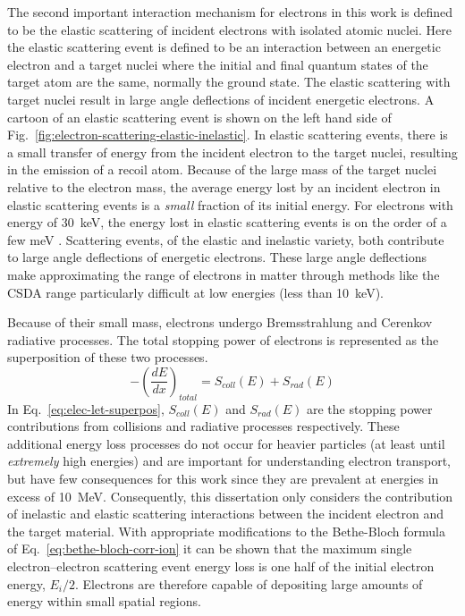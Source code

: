The second important interaction mechanism for electrons in this work is defined to be the elastic scattering of incident electrons with isolated atomic nuclei.
Here the elastic scattering event is defined to be an interaction between an energetic electron and a target nuclei where the initial and final quantum states of the target atom are the same, normally the ground state.
The elastic scattering with target nuclei result in large angle deflections of incident energetic electrons.
A cartoon of an elastic scattering event is shown on the left hand side of Fig.~\ref{fig:electron-scattering-elastic-inelastic}.
In elastic scattering events, there is a small transfer of energy from the incident electron to the target nuclei, resulting in the emission of a recoil atom.
Because of the large mass of the target nuclei relative to the electron mass, the average energy lost by an incident electron in elastic scattering events is a \emph{small} fraction of its initial energy.
For electrons with energy of 30~keV, the energy lost in elastic scattering events is on the order of a few meV \cite{Salvat:ue}.
Scattering events, of the elastic and inelastic variety, both contribute to large angle deflections of energetic electrons.
These large angle deflections make approximating the range of electrons in matter through methods like the CSDA range particularly difficult at low energies (less than 10~keV).

Because of their small mass, electrons undergo Bremsstrahlung and Cerenkov radiative processes.
The total stopping power of electrons is represented as the superposition of these two processes.
\begin{equation}
    \label{eq:elec-let-superpos}
    -\left(\frac{dE}{dx}\right)_{total} = S_{coll}(E) + S_{rad}(E)
\end{equation}
In Eq.~\ref{eq:elec-let-superpos}, $S_{coll}(E)$ and $S_{rad}(E)$ are the stopping power contributions from collisions and radiative processes respectively.
These additional energy loss processes do not occur for heavier particles (at least until \emph{extremely} high energies) and are important for understanding electron transport, but have few consequences for this work since they are prevalent at energies in excess of 10~MeV.
Consequently, this dissertation only considers the contribution of inelastic and elastic scattering interactions between the incident electron and the target material.
With appropriate modifications to the Bethe-Bloch formula of Eq.~\ref{eq:bethe-bloch-corr-ion} it can be shown that the maximum single electron--electron scattering event energy loss is one half of the initial electron energy, $E_i/2$.
Electrons are therefore capable of depositing large amounts of energy within small spatial regions.

